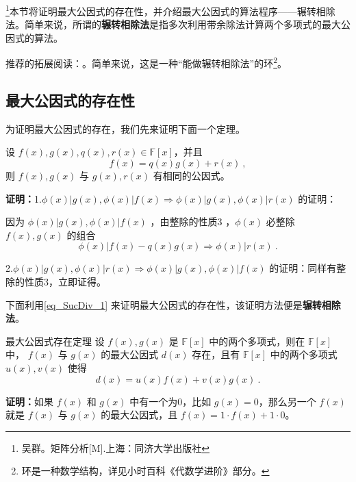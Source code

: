 
\begin{issues}
\end{issues}
\footnote{吴群。矩阵分析[M].上海：同济大学出版社}本节将证明最大公因式的存在性，并介绍最大公因式的算法程序——辗转相除法。简单来说，所谓的\textbf{辗转相除法}是指多次利用带余除法计算两个多项式的最大公因式的算法。


推荐的拓展阅读：。简单来说，这是一种“能做辗转相除法”的环\footnote{环是一种数学结构，详见小时百科《代数学进阶》部分。}。


\subsection{最大公因式的存在性}
为证明最大公因式的存在，我们先来证明下面一个定理。
\begin{theorem}{}\label{the_SucDiv_1}
设 $f(x),g(x),q(x),r(x)\in\mathbb{F}[x]$，并且
\begin{equation}\label{eq_SucDiv_1}
f(x)=q(x)g(x)+r(x)~,
\end{equation}
则 $f(x),g(x)$ 与 $g(x),r(x)$ 有相同的公因式。
\end{theorem}
\textbf{证明：}1.$\phi(x)|g(x),\phi(x)|f(x)\Rightarrow \phi(x)|g(x),\phi(x)|r(x)$ 的证明：

因为 $\phi(x)|g(x),\phi(x)|f(x)$ ，由整除的性质3 ，$\phi(x)$ 必整除 $f(x),g(x)$ 的组合
\begin{equation}
\phi(x)|f(x)-q(x)g(x)\Rightarrow \phi(x)|r(x)~.
\end{equation}

2.$\phi(x)|g(x),\phi(x)|r(x)\Rightarrow\phi(x)|g(x),\phi(x)|f(x)$ 的证明：同样有整除的性质3，立即证得。

下面利用\autoref{eq_SucDiv_1} 来证明最大公因式的存在性，该证明方法便是\textbf{辗转相除法}。
\begin{theorem}{最大公因式存在定理}\label{the_SucDiv_2}
设 $f(x),g(x)$ 是 $\mathbb{F}[x]$ 中的两个多项式，则在 $\mathbb{F}[x]$ 中， $f(x)$ 与 $g(x)$ 的最大公因式 $d(x)$ 存在，且有 $\mathbb{F}[x]$ 中的两个多项式 $u(x),v(x)$ 使得
\begin{equation}\label{eq_SucDiv_2}
d(x)=u(x)f(x)+v(x)g(x)~.
\end{equation}

\end{theorem}
\textbf{证明：}如果 $f(x)$ 和 $g(x)$ 中有一个为0，比如 $g(x)=0$，那么另一个 $f(x)$ 就是 $f(x)$ 与 $g(x)$ 的最大公因式，且 $f(x)=1\cdot f(x)+1\cdot0$。

